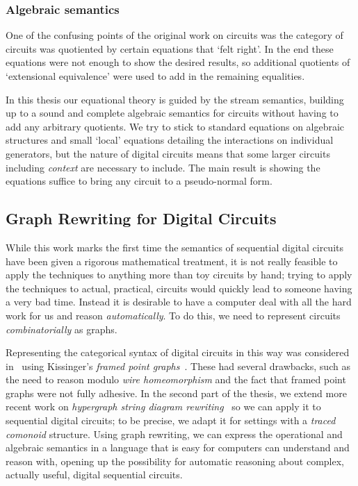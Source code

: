 \subsubsection{Algebraic semantics}

One of the confusing points of the original work on circuits was the category
of circuits was quotiented by certain equations that `felt right'.
In the end these equations were not enough to show the desired results,
so additional quotients of `extensional equivalence' were used to add in the
remaining equalities.

In this thesis our equational theory is guided by the stream semantics,
building up to a sound and complete algebraic semantics for circuits without
having to add any arbitrary quotients.
We try to stick to standard equations on algebraic structures and small `local'
equations detailing the interactions on individual generators, but the nature of
digital circuits means that some larger circuits including \emph{context} are
necessary to include.
The main result is showing the equations suffice to bring any circuit to a
pseudo-normal form.

\subsection{Graph Rewriting for Digital Circuits}

While this work marks the first time the semantics of sequential digital
circuits have been given a rigorous mathematical treatment, it is not really
feasible to apply the techniques to anything more than toy circuits by hand;
trying to apply the techniques to actual, practical, circuits would quickly lead
to someone having a very bad time.
Instead it is desirable to have a computer deal with all the hard work
for us and reason \emph{automatically}.
To do this, we need to represent circuits \emph{combinatorially} as graphs.

Representing the categorical syntax of digital circuits in this way was
considered in~\cite{ghica2017diagrammatic} using
Kissinger's \emph{framed point graphs}~\cite{kissinger2012pictures}.
These had several drawbacks, such as the need to reason modulo
\emph{wire homeomorphism} and the fact that framed point graphs were not fully
adhesive.
In the second part of the thesis, we extend more recent work on
\emph{hypergraph string diagram rewriting}~\cite{bonchi2022string,bonchi2022stringa,bonchi2022stringb}
so we can apply it to sequential digital circuits; to be precise, we adapt it
for settings with a \emph{traced comonoid} structure.
Using graph rewriting, we can express the operational and algebraic semantics
in a language that is easy for computers can understand and reason with, opening
up the possibility for automatic reasoning about complex, actually useful,
digital sequential circuits.
